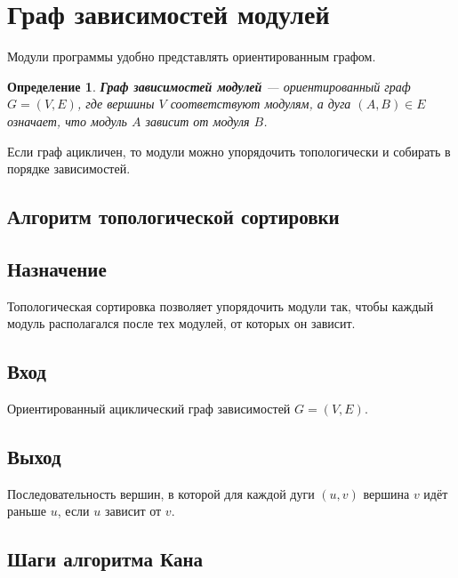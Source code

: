 \documentclass[12pt,a4paper]{article}
\newtheorem{definition}{Определение}
\begin{document}
\section{Граф зависимостей модулей}

Модули программы удобно представлять ориентированным графом.

\begin{definition}
\textbf{Граф зависимостей модулей} --- ориентированный граф $G = (V, E)$, где вершины $V$ соответствуют модулям, а дуга $(A, B) \in E$ означает, что модуль $A$ зависит от модуля $B$.
\end{definition}

Если граф ацикличен, то модули можно упорядочить топологически и собирать в порядке зависимостей.

\subsection{Алгоритм топологической сортировки}

\subsection*{Назначение}

Топологическая сортировка позволяет упорядочить модули так, чтобы каждый модуль располагался после тех модулей, от которых он зависит.

\subsection*{Вход}

Ориентированный ациклический граф зависимостей $G = (V, E)$.

\subsection*{Выход}

Последовательность вершин, в которой для каждой дуги $(u, v)$ вершина $v$ идёт раньше $u$, если $u$ зависит от $v$.

\subsection*{Шаги алгоритма Кана}
\end{document}
